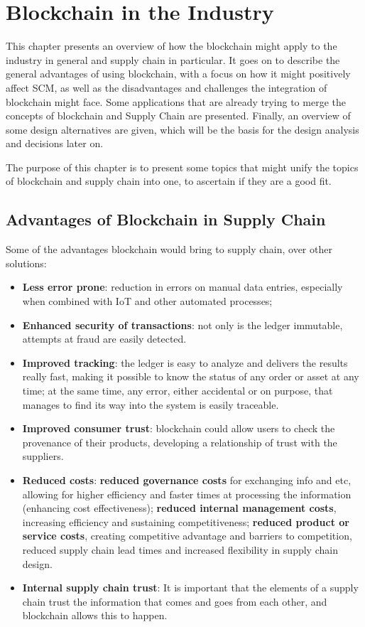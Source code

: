 \chapter{Blockchain in the Industry}
\label{chap:blockchain-applicability}

\minitoc \mtcskip \noindent

This chapter presents an overview of how the blockchain might apply to the industry in general and supply chain in particular. It goes on to describe the general advantages of using blockchain, with a focus on how it might positively affect SCM, as well as the disadvantages and challenges the integration of blockchain might face. Some applications that are already trying to merge the concepts of blockchain and Supply Chain are presented. Finally, an overview of some design alternatives are given, which will be the basis for the design analysis  and decisions later on. 

The purpose of this chapter is to present some topics that might unify the topics of blockchain and supply chain into one, to ascertain if they are a good fit.

\section{Advantages of Blockchain in Supply Chain}
\label{sec:advantes-blockchain}
Some of the advantages blockchain would bring to supply chain, over other solutions:

\begin{itemize}
\item \textbf{Less error prone}: reduction in errors on manual data entries, especially when combined with IoT and other automated processes;
\item \textbf{Enhanced security of transactions}: not only is the ledger immutable, attempts at fraud are easily detected.
\item \textbf{Improved tracking}: the ledger is easy to analyze and delivers the results really fast, making it possible to know the status of any order or asset at any time; at the same time, any error, either accidental or on purpose, that manages to find its way into the system is easily traceable.
\item \textbf{Improved consumer trust}: blockchain could allow users to check the provenance of their products, developing a relationship of trust with the suppliers.
\item \textbf{Reduced costs}: \textbf{reduced governance costs} for exchanging info and etc, allowing for higher efficiency and faster times at processing the information (enhancing cost effectiveness); \textbf{reduced internal management costs}, increasing efficiency and sustaining competitiveness; \textbf{reduced product or service costs}, creating competitive advantage and barriers to competition, reduced supply chain lead times and increased flexibility in supply chain design. %
\item \textbf{Internal supply chain trust}: It is important that the elements of a supply chain trust the information that comes and goes from each other, and blockchain allows this to happen.

\end{itemize}

